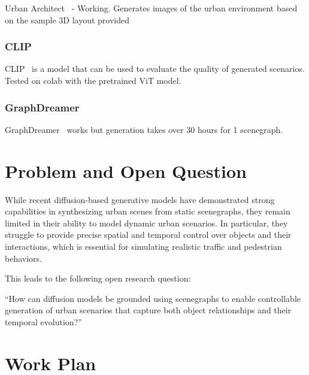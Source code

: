 \documentclass{article}
\begin{document}
Urban Architect~\cite{lu2024urban} - Working. Generates images of the urban environment based on the sample 3D layout provided

\subsubsection{CLIP}

CLIP~\cite{radford2021learning} is a model that can be used to evaluate the quality of generated scenarios. Tested on colab with the pretrained ViT model.

\subsubsection{GraphDreamer}

GraphDreamer~\cite{gao2024graphdreamer} works but generation takes over 30 hours for 1 scenegraph.

\section{Problem and Open Question}

While recent diffusion-based generative models have demonstrated strong capabilities in synthesizing urban scenes from static scenegraphs, they remain limited in their ability to model dynamic urban scenarios. In particular, they struggle to provide precise spatial and temporal control over objects and their interactions, which is essential for simulating realistic traffic and pedestrian behaviors.

This leads to the following open research question:

“How can diffusion models be grounded using scenegraphs to enable controllable generation of urban scenarios that capture both object relationships and their temporal evolution?”

\section{Work Plan}
\end{document}
